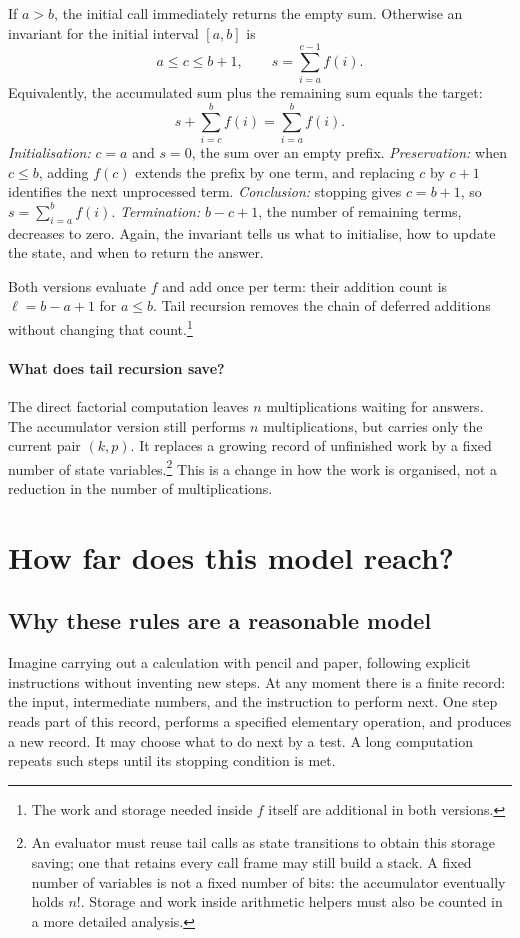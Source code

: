 If $a>b$, the initial call immediately returns the empty sum. Otherwise
an invariant for the initial interval $[a,b]$ is
\[
a\leq c\leq b+1,\qquad s=\sum_{i=a}^{c-1}f(i).
\]
Equivalently, the accumulated sum plus the remaining sum equals the target:
\[
s+\sum_{i=c}^{b}f(i)=\sum_{i=a}^{b}f(i).
\]
\emph{Initialisation:} $c=a$ and $s=0$, the sum over an empty prefix.
\emph{Preservation:} when $c\leq b$, adding $f(c)$ extends the prefix by
one term, and replacing $c$ by $c+1$ identifies the next unprocessed term.
\emph{Conclusion:} stopping gives $c=b+1$, so $s=\sum_{i=a}^{b}f(i)$.
\emph{Termination:} $b-c+1$, the number of remaining terms, decreases to zero.
Again, the invariant tells us what to initialise, how to update the state,
and when to return the answer.

Both versions evaluate $f$ and add once per term: their addition count is
$\ell=b-a+1$ for $a\leq b$. Tail recursion removes the chain of deferred
additions without changing that count.\footnote{The work and storage
needed inside $f$ itself are additional in both versions.}

\paragraph{What does tail recursion save?}
The direct factorial computation leaves $n$ multiplications waiting for
answers. The accumulator version still performs $n$ multiplications, but
carries only the current pair $(k,p)$. It replaces a growing record of
unfinished work by a fixed number of state variables.\footnote{An evaluator
must reuse tail calls as state transitions to obtain this storage saving;
one that retains every call frame may still build a stack. A fixed number
of variables is not a fixed number of bits: the accumulator eventually
holds $n!$. Storage and work inside arithmetic helpers must also be counted
in a more detailed analysis.} This is a change in how the work is organised,
not a reduction in the number of multiplications.

\section{How far does this model reach?}

\subsection{Why these rules are a reasonable model}

Imagine carrying out a calculation with pencil and paper, following explicit
instructions without inventing new steps. At any moment there is a finite
record: the input, intermediate numbers, and the instruction to perform next.
One step reads part of this record, performs a specified elementary operation,
and produces a new record. It may choose what to do next by a test. A long
computation repeats such steps until its stopping condition is met.

